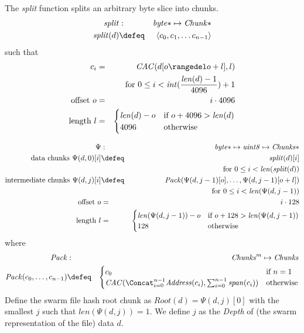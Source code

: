 
\begin{definition}
\label{def:chunking}
The \emph{split} function splits an arbitrary byte slice into chunks.
\begin{eqnarray}
\mathit{split}&:&\mathit{byte}{*}\mapsto\mathit{Chunk}{*}\\
\mathit{split}(d)&\defeq&\langle c_0, c_1, \ldots c_{n-1}\rangle\\
\end{eqnarray}
such that
\begin{eqnarray}
c_i&=&\mathit{CAC}(d[o\rangedel o+l],l)\\
&&\text{for }0\leq i<\mathit{int}( \frac{\mathit{len}(d)-1}{4096})+1
\\
\text{offset }o&=&i\cdot 4096\\
\text{length }l&=&\begin{cases}
\mathit{len}(d)-o&\text{if }o+4096>\mathit{len}(d)\\
4096&\text{otherwise}
\end{cases}
\end{eqnarray}
\end{definition}

\begin{definition}
\label{def:lambda}
\begin{eqnarray}
\Psi&:&\mathit{byte}{*}\mapsto\mathit{uint8}\mapsto\mathit{Chunks}{*}\\
\text{data chunks }\Psi(d,0)[i] &\defeq&\mathit{split}(d)[i]\\ 
&&\text{for }0\leq i< \mathit{len}(\mathit{split}(d))\\
\text{intermediate chunks }\Psi(d,j)[i]&\defeq&\mathit{Pack}( 
\Psi(d,j-1)[o],\ldots,\Psi(d,j-1)[o+l])\\
&&\text{for }0\leq i<\mathit{len}(\Psi(d,j-1))\\
\text{offset }o&=&i\cdot 128\\
\text{length }l&=&\begin{cases}
\mathit{len}(\Psi(d,j-1))-o&\text{if }o+128>\mathit{len}(\Psi(d,j-1))\\
128&\text{otherwise}
\end{cases}
\end{eqnarray}
where
\begin{eqnarray}
\mathit{Pack}&:&\mathit{Chunks}^m\mapsto\mathit{Chunks}\\
\mathit{Pack}(c_0,\ldots ,c_{n-1})&\defeq&
\begin{cases}
c_0&\text{if }n=1\\
\mathit{CAC}(\Concat_{i=0}^{n-1}\mathit{Address}(c_i),\sum_{i=0}^{n-1}\mathit{span}(c_i))&\text{otherwise}
\end{cases}
\end{eqnarray}
Define the swarm file hash root chunk as $\mathit{Root}(d) = \Psi(d,j)[0]$ with the smallest $j$ such that $\mathit{len}(\Psi(d,j))=1$. We define $j$ as the \emph{Depth} of (the swarm representation of the file) data $d$.  
\end{definition}

